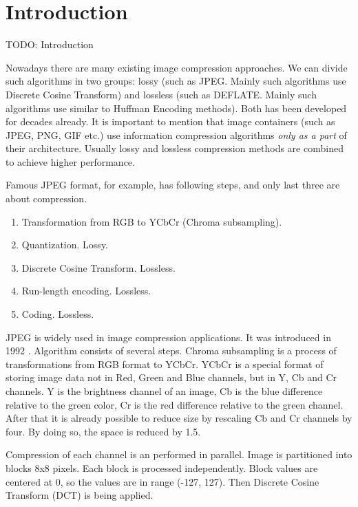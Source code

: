 \chapter{Introduction}

TODO: Introduction


Nowadays there are many existing image compression approaches. We can divide such algorithms in two groups: lossy (such as JPEG. Mainly such algorithms use Discrete Cosine Transform) and lossless (such as DEFLATE. Mainly such algorithms use similar to Huffman Encoding methods). Both has been developed for decades already. It is important to mention that image containers (such as JPEG, PNG, GIF etc.) use information compression algorithms \textit{only as a part} of their architecture. Usually lossy and lossless compression methods are combined to achieve higher performance.

Famous JPEG format, for example, has following steps, and only last three are about compression.

\begin{enumerate}
    \item Transformation from RGB to YCbCr (Chroma subsampling).
    \item Quantization. Lossy.
    \item Discrete Cosine Transform. Lossless.
    \item Run-length encoding. Lossless.
    \item Coding. Lossless.
\end{enumerate}

JPEG is widely used in image compression applications. It was introduced in 1992 \cite{wallace_jpeg_1992}. Algorithm consists of several steps. Chroma subsampling is a process of transformations from RGB format to YCbCr. YCbCr is a special format of storing image data not in Red, Green and Blue channels, but in Y, Cb and Cr channels. Y is the brightness channel of an image, Cb is the blue difference relative to the green color, Cr is the red difference relative to the green channel. After that it is already possible to reduce size by rescaling Cb and Cr channels by four. By doing so, the space is reduced by 1.5.

Compression of each channel is an performed in parallel. Image is partitioned into blocks 8x8 pixels. Each block is processed independently. Block values are centered at 0, so the values are in range (-127, 127). Then Discrete Cosine Transform (DCT) is being applied.

